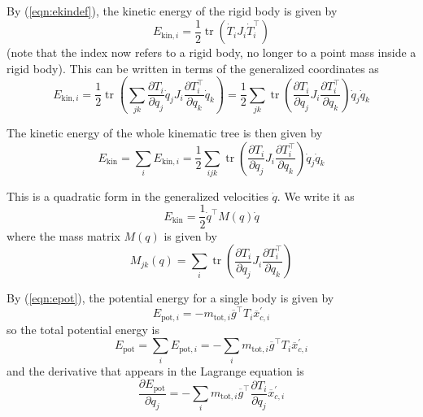 \documentclass[a4paper]{article}
\begin{document}
By (\ref{eqn:ekindef}), the kinetic energy of the rigid body is given by
\begin{equation}
E_{\mathrm{kin},i} = \frac{1}{2} \operatorname{tr} (\dot{T}_i J_i \dot{T}_i^\top)
\end{equation}
(note that the index now refers to a rigid body, no longer to a point mass inside a rigid body). This can be written in terms of the generalized coordinates as
\begin{equation}
E_{\mathrm{kin},i} = \frac{1}{2} \operatorname{tr} (\sum_{jk} \frac{\partial T_i}{\partial q_j} \dot{q}_j J_i \frac{\partial T_i^\top}{\partial q_k} \dot{q}_k)
= \frac{1}{2} \sum_{jk} \operatorname{tr} (\frac{\partial T_i}{\partial q_j} J_i \frac{\partial T_i^\top}{\partial q_k}) \dot{q}_j \dot{q}_k
\end{equation}

The kinetic energy of the whole kinematic tree is then given by
\begin{equation}
E_\mathrm{kin} = \sum_i E_{\mathrm{kin},i} = \frac{1}{2} \sum_{ijk} \operatorname{tr} (\frac{\partial T_i}{\partial q_j} J_i \frac{\partial T_i^\top}{\partial q_k}) \dot{q}_j \dot{q}_k
\end{equation}

This is a quadratic form in the generalized velocities $\dot{q}$. We write it as
\begin{equation}
E_\mathrm{kin} = \frac{1}{2} \dot{q}^\top M(q) \dot{q}
\end{equation}
where the mass matrix $M(q)$ is given by
\begin{equation}
M_{jk}(q) = \sum_i \operatorname{tr} (\frac{\partial T_i}{\partial q_j} J_i \frac{\partial T_i^\top}{\partial q_k})
\end{equation}

By (\ref{eqn:epot}), the potential energy for a single body is given by
\begin{equation}
E_{\mathrm{pot},i} = - m_{\mathrm{tot},i} \overline{g}^\top T_i \overline{x}_{c,i}^\prime
\end{equation}
so the total potential energy is
\begin{equation}
E_\mathrm{pot} = \sum_i E_{\mathrm{pot},i} = - \sum_i m_{\mathrm{tot},i} \overline{g}^\top T_i \overline{x}_{c,i}^\prime
\end{equation}
and the derivative that appears in the Lagrange equation is
\begin{equation}
\frac{\partial E_\mathrm{pot}}{\partial q_j} = - \sum_i m_{\mathrm{tot},i} \overline{g}^\top \frac{\partial T_i}{\partial q_j} \overline{x}_{c,i}^\prime
\end{equation}
\end{document}
